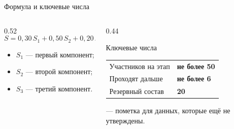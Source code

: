 \begin{frame}{Формула и ключевые числа}
  \begin{columns}[T]
    \begin{column}{0.52\textwidth}
      \vspace{0.5em}
      \[
        S = 0{,}30\,S_1 + 0{,}50\,S_2 + 0{,}20\,S_3
      \]
      \vspace{-0.5em}
      \begin{itemize}\setlength\itemsep{0.3em}
        \item $S_1$ --- первый компонент;
        \item $S_2$ --- второй компонент;
        \item $S_3$ --- третий компонент.
      \end{itemize}
    \end{column}
    \begin{column}{0.44\textwidth}
      \begin{block}{Ключевые числа}
        \begin{tabular}{@{}p{}>{\raggedleft\arraybackslash}p{}@{}}
          Участников на этап & \textbf{не более 50} \\[0.35em]
          Проходят дальше & \textbf{не более 6} \\[0.35em]
          Резервный состав & \textbf{20} \\
        \end{tabular}
      \end{block}
      {\footnotesize\color{acGray}
       --- пометка для данных, которые ещё не утверждены.}
    \end{column}
  \end{columns}
\end{frame}
